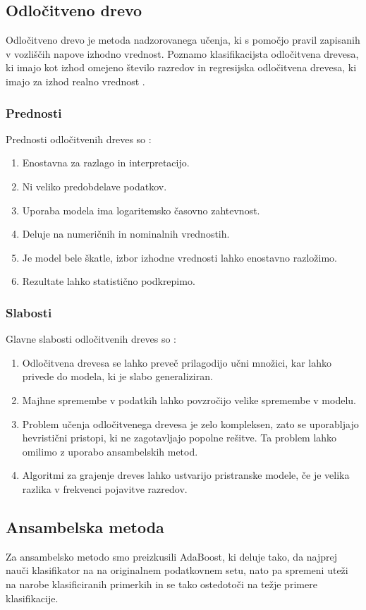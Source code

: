 \documentclass{acm_proc_article-sp}
\begin{document}
\subsection{Odločitveno drevo}
Odločitveno drevo je metoda nadzorovanega učenja, ki s pomočjo pravil zapisanih v vozliščih napove izhodno vrednost. Poznamo klasifikacijsta odločitvena drevesa, ki imajo kot izhod omejeno število razredov in regresijska odločitvena drevesa, ki imajo za izhod realno vrednost \cite{Wiki_tree}.
\subsubsection{Prednosti}
Prednosti odločitvenih dreves so \cite{SciTree}:
\begin{enumerate}
\item{Enostavna za razlago in interpretacijo.}
\item{Ni veliko predobdelave podatkov.}
\item{Uporaba modela ima logaritemsko časovno zahtevnost.}
\item{Deluje na numeričnih in nominalnih vrednostih.}
\item{Je model bele škatle, izbor izhodne vrednosti lahko enostavno razložimo.}
\item{Rezultate lahko statistično podkrepimo.}
\end{enumerate}
\subsubsection{Slabosti}
Glavne slabosti odločitvenih dreves so \cite{SciTree}:
\begin{enumerate}
\item{Odločitvena drevesa se lahko preveč prilagodijo učni množici, kar lahko privede do modela, ki je slabo generaliziran.}
\item{Majhne spremembe v podatkih lahko povzročijo velike spremembe v modelu.}
\item{Problem učenja odločitvenega drevesa je zelo kompleksen, zato se uporabljajo hevristični pristopi, ki ne zagotavljajo popolne rešitve. Ta problem lahko omilimo z uporabo ansambelskih metod.}
\item{Algoritmi za grajenje dreves lahko ustvarijo pristranske modele, če je velika razlika v frekvenci pojavitve razredov. }
\end{enumerate}

\subsection{Ansambelska metoda}
Za ansambelsko metodo smo preizkusili AdaBoost, ki deluje tako, da najprej nauči klasifikator na na originalnem podatkovnem setu, nato pa spremeni uteži na narobe klasificiranih primerkih in se tako ostedotoči na težje primere klasifikacije. \cite{SciAda}
\end{document}
